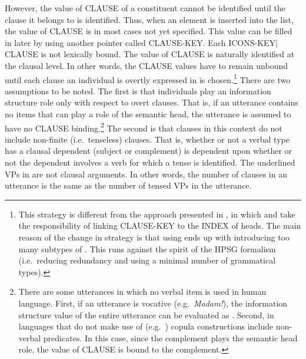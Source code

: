 However, the value of CLAUSE of a constituent cannot be identified
until the clause it belongs to is identified. Thus, when an
 element is inserted into the  list, the
value of CLAUSE is in most cases not yet specified. This value can be
filled in later by using another pointer called CLAUSE-KEY.  Each
\mbox{ICONS-KEY{$\mid$}CLAUSE} is not lexically bound. The
value of CLAUSE is naturally identified at the clausal level.  In
other words, the CLAUSE values have to remain unbound until each
clause an individual is overtly expressed in is chosen.\footnote{This
  strategy is different from the approach presented in
  \citet{song:bender:12}, in which  and
   take the responsibility of linking
  CLAUSE-KEY to the INDEX of heads. The main reason of the change in
  strategy is that using  ends up with
  introducing too many subtypes of
  . This runs against the spirit
  of the HPSG formalism (i.e.\ reducing redundancy and using
  a minimal number of grammatical types).} There are two assumptions
to be noted. The first is that individuals play an information
structure role only with respect to overt clauses.  That is, if an
utterance contains no items that can play a role of the semantic head,
the utterance is assumed to have no CLAUSE binding.\footnote{There are
  some utterances in which no verbal item is used in human language.
  First, if an utterance is vocative (e.g.\ \textit{Madam!}), the
  information structure value of the entire utterance can be evaluated
  as .  Second, in languages that do not make use of
   (e.g.\ ) copula constructions include
  non-verbal predicates. In this case, since the complement plays the
  semantic head role, the value of CLAUSE is bound to the complement.}
The second is that clauses in this context do not include non-finite
(i.e.\ tenseless) clauses. That is, whether or not a verbal type has a
clausal dependent (subject or complement) is dependent upon whether or
not the dependent involves a verb for which a tense is identified. The
underlined VPs in  are not clausal arguments. In other
words, the number of clauses in an utterance is the same as the number
of tensed VPs in the utterance.




